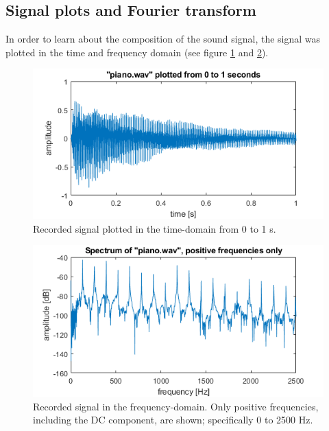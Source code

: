\documentclass[journal]{IEEEtran}
\begin{document}
\subsection{Signal plots and Fourier transform}
In order to learn about the composition of the sound signal, the signal was plotted in the time and frequency domain (see figure \ref{fig:time} and \ref{fig:freq}). 

\begin{figure} [h]
    \centering
    \includegraphics[width=\linewidth]{assignment_01/plots/time_plot.png}
    \caption{Recorded signal plotted in the time-domain from 0 to 1 s.}
    \label{fig:time}
\end{figure}
\begin{figure} [h]
    \centering
    \includegraphics[width=\linewidth]{assignment_01/plots/freq_plot.png}
    \caption{Recorded signal in the frequency-domain. Only positive frequencies, including the DC component, are shown; specifically 0 to 2500 Hz.}
    \label{fig:freq}
\end{figure}
\end{document}
